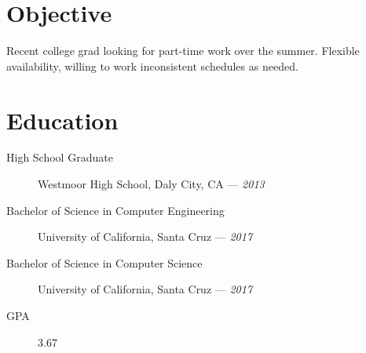 \documentclass[10pt]{article}
\author{August Valera}
\begin{document}

\section*{Objective}
Recent college grad looking for part-time work over the summer. Flexible availability, willing to work inconsistent schedules as needed.

\section*{Education}
\begin{description}
  \item[High School Graduate] Westmoor High School, Daly City, CA ---
    \textit{2013}
  \item[Bachelor of Science in Computer Engineering] University of California,
    Santa Cruz --- \textit{2017}
  \item[Bachelor of Science in Computer Science] University of California,
    Santa Cruz --- \textit{2017}
  \item[GPA] 3.67
\end{description}
\end{document}
